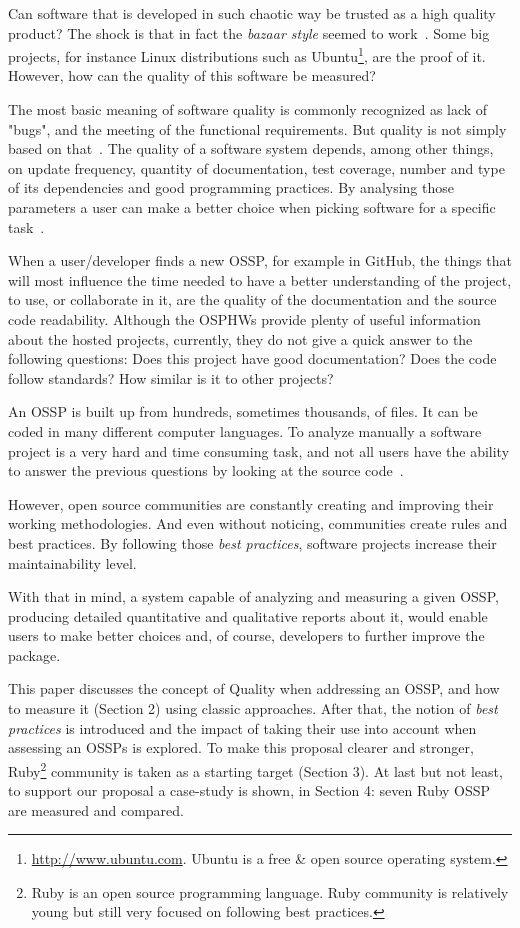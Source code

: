 Can software that is developed in such chaotic way be trusted as a high quality product?
The shock is that in fact the \textit{bazaar style} seemed to work~\cite{halloran2002high}.
Some big projects, for instance Linux distributions such as \textsf{Ubuntu}\footnote{\url{http://www.ubuntu.com}.
Ubuntu is a free \& open source operating system.},
are the proof of it.
However, how can the quality of this software be measured?

The most basic meaning of software quality is commonly recognized as lack of "bugs", and the meeting of the functional requirements.
But quality is not simply based on that~\cite{gousios2007software}.
The quality of a software system depends, among other things, on update frequency, quantity of documentation, test coverage,
number and type of its dependencies and good programming practices.
By analysing those parameters a user can make a better choice when picking software for a specific task~\cite{marchenko2007predicting}.

When a user/developer finds a new OSSP, for example in
GitHub, the things that will most influence the time needed to have a better understanding of the project, to use, or collaborate in it,
are the quality of the documentation and the source code readability.
Although the OSPHWs provide plenty of useful information about the hosted projects,
currently, they do not give a quick answer to the following questions:
Does this project have good documentation? Does the code follow standards? How similar is it to other projects?

An OSSP is built up from hundreds, sometimes thousands, of files. It can be coded in many different computer languages.
To  analyze manually a software project is a very hard and time consuming task,
and not all users have the ability to answer the previous questions by looking at the source code~\cite{crowston2003defining}.

However, open source communities are constantly creating and improving their working methodologies.
And even without noticing, communities create rules and best practices.
By following those \emph{best practices}, software projects increase their maintainability level.

With that in mind, a system capable of analyzing and measuring a given OSSP,
producing detailed quantitative and qualitative reports about it,
would enable users to make better choices and, of course, developers to further improve the package.

This paper discusses the concept of Quality when addressing an OSSP, and how to measure it (Section 2) using classic approaches.
After that,  the notion of \emph{best practices} is introduced and  the impact  of
taking their use into account when assessing an  OSSPs is explored.
To make this proposal clearer and stronger,
\textsf{Ruby}\footnote{Ruby is an open source programming language. Ruby community is relatively young but still very focused on following best practices.  }
community is taken as a starting target (Section 3).
At last but not least, to support our proposal a case-study is shown, in Section 4: seven Ruby OSSP are measured and compared.